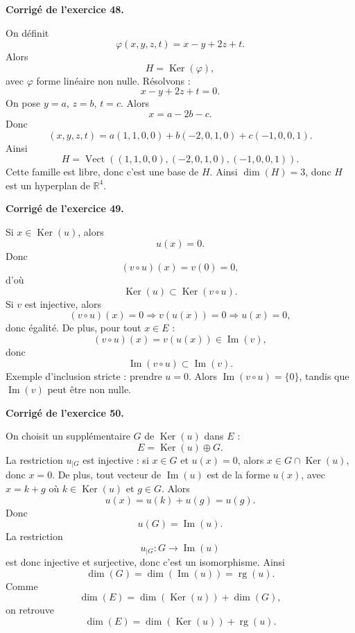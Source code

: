 \documentclass[11pt,a4paper]{article}
\newcommand{\corr}[1]{
    \vspace{0.4cm}
    \noindent\textbf{\textcolor{blue!60!black}{Corrigé de l'exercice #1.}}
    \par\vspace{0.1cm}
}
\newcommand{\Ker}{\operatorname{Ker}}
\newcommand{\Img}{\operatorname{Im}}
\newcommand{\rg}{\operatorname{rg}}
\newcommand{\Vect}{\operatorname{Vect}}
\begin{document}
\corr{48}
On définit
\[
\varphi(x,y,z,t)=x-y+2z+t.
\]
Alors
\[
H=\Ker(\varphi),
\]
avec $\varphi$ forme linéaire non nulle. Résolvons :
\[
x-y+2z+t=0.
\]
On pose $y=a$, $z=b$, $t=c$. Alors
\[
x=a-2b-c.
\]
Donc
\[
(x,y,z,t)=a(1,1,0,0)+b(-2,0,1,0)+c(-1,0,0,1).
\]
Ainsi
\[
H=\Vect((1,1,0,0),(-2,0,1,0),(-1,0,0,1)).
\]
Cette famille est libre, donc c'est une base de $H$. Ainsi $\dim(H)=3$, donc $H$ est un hyperplan de $\mathbb{R}^4$.

\corr{49}
Si $x\in\Ker(u)$, alors
\[
u(x)=0.
\]
Donc
\[
(v\circ u)(x)=v(0)=0,
\]
d'où
\[
\Ker(u)\subset\Ker(v\circ u).
\]
Si $v$ est injective, alors
\[
(v\circ u)(x)=0 \Rightarrow v(u(x))=0 \Rightarrow u(x)=0,
\]
donc égalité.
De plus, pour tout $x\in E$ :
\[
(v\circ u)(x)=v(u(x))\in\Img(v),
\]
donc
\[
\Img(v\circ u)\subset\Img(v).
\]
Exemple d'inclusion stricte : prendre $u=0$. Alors $\Img(v\circ u)=\{0\}$, tandis que $\Img(v)$ peut être non nulle.

\corr{50}
On choisit un supplémentaire $G$ de $\Ker(u)$ dans $E$ :
\[
E=\Ker(u)\oplus G.
\]
La restriction $u_{|G}$ est injective : si $x\in G$ et $u(x)=0$, alors $x\in G\cap\Ker(u)$, donc $x=0$.
De plus, tout vecteur de $\Img(u)$ est de la forme $u(x)$, avec $x=k+g$ où $k\in\Ker(u)$ et $g\in G$. Alors
\[
u(x)=u(k)+u(g)=u(g).
\]
Donc
\[
u(G)=\Img(u).
\]
La restriction
\[
u_{|G}:G\to\Img(u)
\]
est donc injective et surjective, donc c'est un isomorphisme. Ainsi
\[
\dim(G)=\dim(\Img(u))=\rg(u).
\]
Comme
\[
\dim(E)=\dim(\Ker(u))+\dim(G),
\]
on retrouve
\[
\dim(E)=\dim(\Ker(u))+\rg(u).
\]
\end{document}
